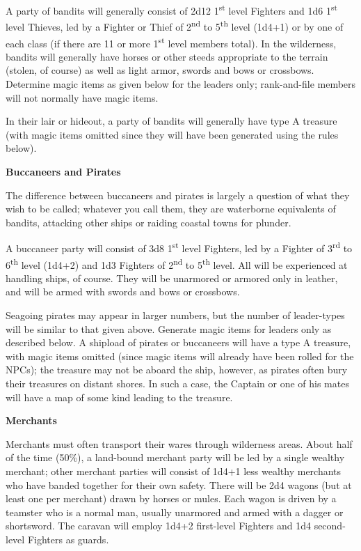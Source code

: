 \documentclass[a4paper,twoside,openany,10pt]{book}
\begin{document}
\begin{multicols}{2}
A party of bandits will generally consist of 2d12 1\textsuperscript{st} level Fighters and 1d6 1\textsuperscript{st} level Thieves, led by a Fighter or Thief of 2\textsuperscript{nd} to 5\textsuperscript{th} level (1d4+1) or by one of each class (if there are 11 or more 1\textsuperscript{st} level members total). In the wilderness, bandits will generally have horses or other steeds appropriate to the terrain (stolen, of course) as well as light armor, swords and bows or crossbows. Determine magic items as given below for the leaders only; rank-and-file members will not normally have magic items.

In their lair or hideout, a party of bandits will generally have type A treasure (with magic items omitted since they will have been generated using the rules below).

\textbf{Buccaneers and Pirates}

The difference between buccaneers and pirates is largely a question of what they wish to be called; whatever you call them, they are waterborne equivalents of bandits, attacking other ships or raiding coastal towns for plunder.

A buccaneer party will consist of 3d8 1\textsuperscript{st} level Fighters, led by a Fighter of 3\textsuperscript{rd} to 6\textsuperscript{th} level (1d4+2) and 1d3 Fighters of 2\textsuperscript{nd} to 5\textsuperscript{th} level. All will be experienced at handling ships, of course. They will be unarmored or armored only in leather, and will be armed with swords and bows or crossbows.

Seagoing pirates may appear in larger numbers, but the number of leader-types will be similar to that given above. Generate magic items for leaders only as described below. A shipload of pirates or buccaneers will have a type A treasure, with magic items omitted (since magic items will already have been rolled for the NPCs); the treasure may not be aboard the ship, however, as pirates often bury their treasures on distant shores. In such a case, the Captain or one of his mates will have a map of some kind leading to the treasure.

\textbf{Merchants}

Merchants must often transport their wares through wilderness areas. About half of the time (50\%), a land-bound merchant party will be led by a single wealthy merchant; other merchant parties will consist of 1d4+1 less wealthy merchants who have banded together for their own safety. There will be 2d4 wagons (but at least one per merchant) drawn by horses or mules. Each wagon is driven by a teamster who is a normal man, usually unarmored and armed with a dagger or shortsword. The caravan will employ 1d4+2 first-level Fighters and 1d4 second-level Fighters as guards.


\end{multicols}
\end{document}
